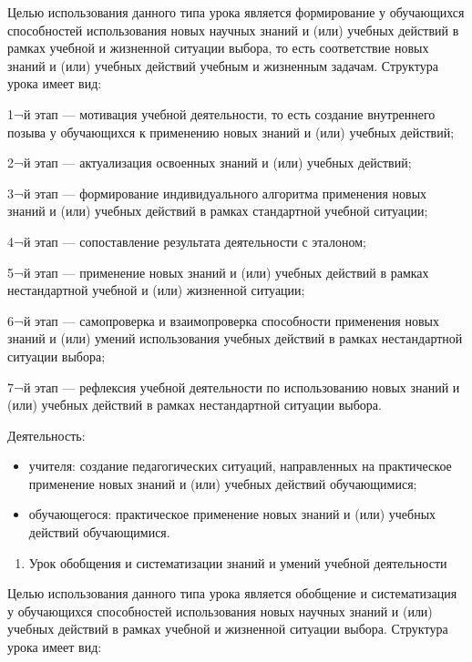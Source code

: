 \documentclass[
  11pt,
]{book}
\providecommand{\tightlist}{%
  \setlength{\itemsep}{0pt}\setlength{\parskip}{0pt}}
\begin{document}
Целью использования данного типа урока является формирование у обучающихся способностей использования новых научных знаний и (или) учебных действий в рамках учебной и жизненной ситуации выбора, то есть соответствие новых знаний и (или) учебных действий учебным и жизненным задачам. Структура урока имеет вид:

1¬й этап --- мотивация учебной деятельности, то есть создание внутреннего позыва у обучающихся к применению новых знаний и (или) учебных действий;

2¬й этап --- актуализация освоенных знаний и (или) учебных действий;

3¬й этап --- формирование индивидуального алгоритма применения новых знаний и (или) учебных действий в рамках стандартной учебной ситуации;

4¬й этап --- сопоставление результата деятельности с эталоном;

5¬й этап --- применение новых знаний и (или) учебных действий в рамках нестандартной учебной и (или) жизненной ситуации;

6¬й этап --- самопроверка и взаимопроверка способности применения новых знаний и (или) умений использования учебных действий в рамках нестандартной ситуации выбора;

7¬й этап --- рефлексия учебной деятельности по использованию новых знаний и (или) учебных действий в рамках нестандартной ситуации выбора.

Деятельность:

\begin{itemize}
\item
  учителя: создание педагогических ситуаций, направленных на практическое применение новых знаний и (или) учебных действий обучающимися;
\item
  обучающегося: практическое применение новых знаний и (или) учебных действий обучающимися.
\end{itemize}

\begin{enumerate}
\def\labelenumi{\arabic{enumi}.}
\setcounter{enumi}{2}
\tightlist
\item
  Урок обобщения и систематизации знаний и умений учебной деятельности
\end{enumerate}

Целью использования данного типа урока является обобщение и систематизация у обучающихся способностей использования новых научных знаний и (или) учебных действий в рамках учебной и жизненной ситуации выбора. Структура урока имеет вид:
\end{document}
